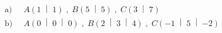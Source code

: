 \begin{exercise}
\begin{minipage}[b]{23em}
      \begin{equation*}
        \begin{split}
          \text{a)}&\;\;
          A\left(\num{1}\;\middle|\;\num{1}\right)
          \;,\;
          B\left(\num{5}\;\middle|\;\num{5}\right)
          \;,\;
          C\left(\num{3}\;\middle|\;\num{7}\right)
          \\
          \text{b)}&\;\;
          A\left(\num{0}\;\middle|\;\num{0}\;\middle|\;\num{0}\right)
          \;,\;
          B\left(\num{2}\;\middle|\;\num{3}\;\middle|\;\num{4}\right)
          \;,\;
          C\left(\num{-1}\;\middle|\;\num{5}\;\middle|\;\num{-2}\right)
        \end{split}
      \end{equation*}%
    \end{minipage}
  \fi
\end{exercise}
